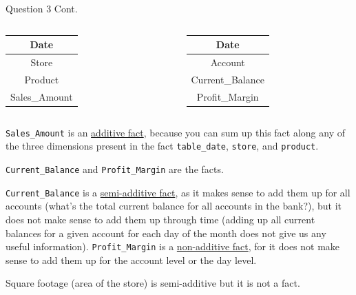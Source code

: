 \begin{frame}[fragile]{Question 3 Cont.}
\vspace{-13pt}
\begin{columns}
\begin{table}[]
	\begin{tabular}{|c|}
		\hline
		Date          \\ \hline
		Store         \\ \hline
		Product       \\ \hline
		Sales\_Amount \\ \hline
	\end{tabular}
\end{table}
\begin{table}[]
	\begin{tabular}{|c|}
		\hline
		Date          \\ \hline
		Account         \\ \hline
		Current\_Balance     \\ \hline
		Profit\_Margin \\ \hline
	\end{tabular}
\end{table}
\end{columns}
\texttt{Sales\_Amount} is an \underline{additive fact}, because you can sum up this fact along any of the three dimensions present in the fact \texttt{table\_date}, \texttt{store}, and \texttt{product}.\\\vspace{3pt}

\texttt{Current\_Balance} and \texttt{Profit\_Margin} are the facts.\\\vspace{3pt}

\texttt{Current\_Balance} is a \underline{semi-additive fact}, as it
makes sense to add them up for all accounts (what's the total current balance for all accounts in the bank?), but it does not make sense to add them up through time (adding up all current balances for a given account for each day of the month does not give us any useful information). \texttt{Profit\_Margin} is a \underline{non-additive fact}, for it does not make sense to add them up for the account level or the day level.\\\vspace{3pt}

Square footage (area of the store) is semi-additive but it is not a fact.
\end{frame}

